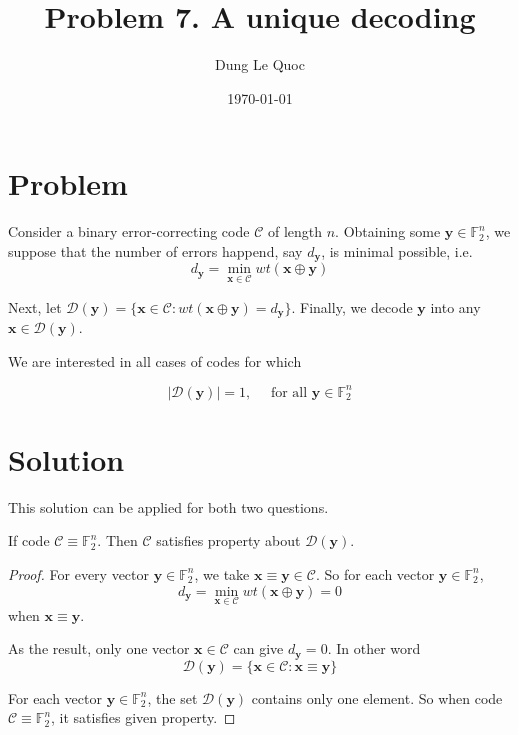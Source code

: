 \documentclass{article}
\title{Problem 7. A unique decoding}
\author{Dung Le Quoc}
\date{\today}
\newcommand{\FF}{\mathbb{F}}
\begin{document}
\maketitle

\section{Problem}

Consider a binary error-correcting code $\mathcal{C}$ of length $n$. Obtaining some $\bm{y} \in \FF_2^n$, we suppose that the number of errors happend, say $d_{\bm{y}}$, is minimal possible, i.e. \[ d_{\bm{y}} = \min_{\bm{x} \in \mathcal{C}} wt(\bm{x} \oplus \bm{y}) \]

Next, let $\mathcal{D}(\bm{y}) = \{ \bm{x} \in \mathcal{C} : wt(\bm{x} \oplus \bm{y}) = d_{\bm{y}} \}$. Finally, we decode $\bm{y}$ into any $\bm{x} \in \mathcal{D}(\bm{y})$.

We are interested in all cases of codes for which

\begin{equation}\label{problem7}
    \lvert \mathcal{D}(\bm{y}) \rvert = 1, \quad \text{ for all } \bm{y} \in \FF_2^n
\end{equation}

\section{Solution}

This solution can be applied for both two questions.

\begin{remark}
    If code $\mathcal{C} \equiv \FF_2^n$. Then $\mathcal{C}$ satisfies property about $\mathcal{D}(\bm{y})$.
\end{remark}

\begin{proof}
    For every vector $\bm{y} \in \FF_2^n$, we take $\bm{x} \equiv \bm{y} \in \mathcal{C}$. So for each vector $\bm{y} \in \FF_2^n$, \[ d_{\bm{y}} = \min_{\bm{x} \in \mathcal{C}} wt(\bm{x} \oplus \bm{y})= 0 \] when $\bm{x} \equiv \bm{y}$.

    As the result, only one vector $\bm{x} \in \mathcal{C}$ can give $d_{\bm{y}} = 0$. In other word \[ \mathcal{D}(\bm{y}) = \{ \bm{x} \in \mathcal{C} : \bm{x} \equiv \bm{y} \} \]

    For each vector $\bm{y} \in \FF_2^n$, the set $\mathcal{D}(\bm{y})$ contains only one element. So when code $\mathcal{C} \equiv \FF_2^n$, it satisfies given property.
\end{proof}
\end{document}

